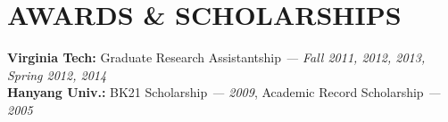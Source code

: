 \section{AWARDS \& SCHOLARSHIPS}
\vspace{0.03in}
{\bf Virginia Tech:} Graduate Research Assistantship {\footnotesize{\it --- Fall
2011, 2012, 2013, Spring 2012, 2014}} \\
{\bf Hanyang Univ.:} BK21 Scholarship {\footnotesize{\it --- 2009}},
Academic Record Scholarship {\footnotesize{\it --- 2005}}

